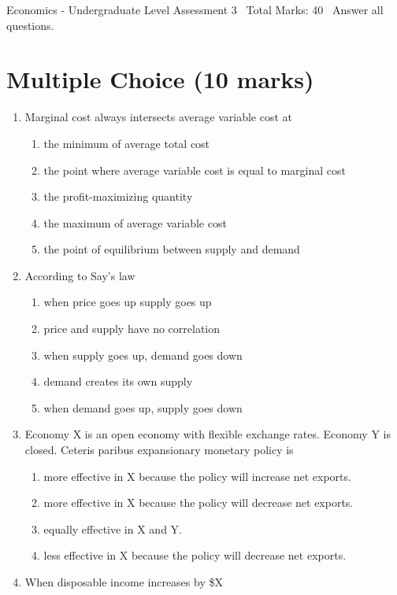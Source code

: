 \documentclass[12pt]{article}
\begin{document}
\begin{center}
Economics - Undergraduate Level Assessment 3 \
Total Marks: 40 \
Answer all questions.
\end{center}

\section*{Multiple Choice (10 marks)}
\begin{enumerate}[label=\arabic*.]
\item Marginal cost always intersects average variable cost at
\begin{enumerate}[label=(\alph*)]
    \item the minimum of average total cost
    \item the point where average variable cost is equal to marginal cost
    \item the profit-maximizing quantity
    \item the maximum of average variable cost
    \item the point of equilibrium between supply and demand
\end{enumerate}
\item According to Say's law
\begin{enumerate}[label=(\alph*)]
    \item when price goes up supply goes up
    \item price and supply have no correlation
    \item when supply goes up, demand goes down
    \item demand creates its own supply
    \item when demand goes up, supply goes down
\end{enumerate}
\item Economy X is an open economy with flexible exchange rates. Economy Y is closed. Ceteris paribus expansionary monetary policy is
\begin{enumerate}[label=(\alph*)]
    \item more effective in X because the policy will increase net exports.
    \item more effective in X because the policy will decrease net exports.
    \item equally effective in X and Y.
    \item less effective in X because the policy will decrease net exports.
\end{enumerate}
\item When disposable income increases by \$X

\end{enumerate}
\end{document}
